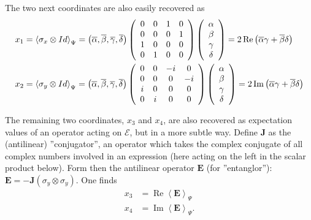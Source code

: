 \documentclass{amsart}
\begin{document}
The two next coordinates are also easily recovered as
\begin{align}
x_{1}  &  =\left\langle \sigma_{x}\otimes Id\right\rangle _{\Psi}=\left(
\overline{\alpha},\overline{\beta},\overline{\gamma},\overline{\delta}\right)
\left(
\begin{array}
[c]{cccc}%
0 & 0 & 1 & 0\\
0 & 0 & 0 & 1\\
1 & 0 & 0 & 0\\
0 & 1 & 0 & 0
\end{array}
\right)  \left(
\begin{array}
[c]{c}%
\alpha\\
\beta\\
\gamma\\
\delta
\end{array}
\right)  =2\operatorname{Re}\left(  \overline{\alpha}\gamma+\overline{\beta
}\delta\right) \\
x_{2}  &  =\left\langle \sigma_{y}\otimes Id\right\rangle _{\Psi}=\left(
\overline{\alpha},\overline{\beta},\overline{\gamma},\overline{\delta}\right)
\left(
\begin{array}
[c]{cccc}%
0 & 0 & -i & 0\\
0 & 0 & 0 & -i\\
i & 0 & 0 & 0\\
0 & i & 0 & 0
\end{array}
\right)  \left(
\begin{array}
[c]{c}%
\alpha\\
\beta\\
\gamma\\
\delta
\end{array}
\right)  =2\operatorname{Im}\left(  \overline{\alpha}\gamma+\overline{\beta
}\delta\right)
\end{align}

The remaining two coordinates, $x_{3}$ and $x_{4}$, are also recovered as
expectation values of an operator acting on $\mathcal{E}$, but in a more
subtle way. Define $\mathbf{J}$ as the (antilinear) ''conjugator'', an
operator which takes the complex conjugate of all complex numbers involved in
an expression (here acting on the left in the scalar product below). Form then
the antilinear operator $\mathbf{E}$ (for ''entanglor''): $\mathbf{E}%
=-\mathbf{J}\left(  \sigma_{y}\otimes\sigma_{y}\right)  $. One finds%
\begin{align}
x_{3} &  =\operatorname{Re}\left\langle \mathbf{E}\right\rangle _{\Psi}\\
x_{4} &  =\operatorname{Im}\left\langle \mathbf{E}\right\rangle _{\Psi
}.\nonumber
\end{align}
\end{document}
